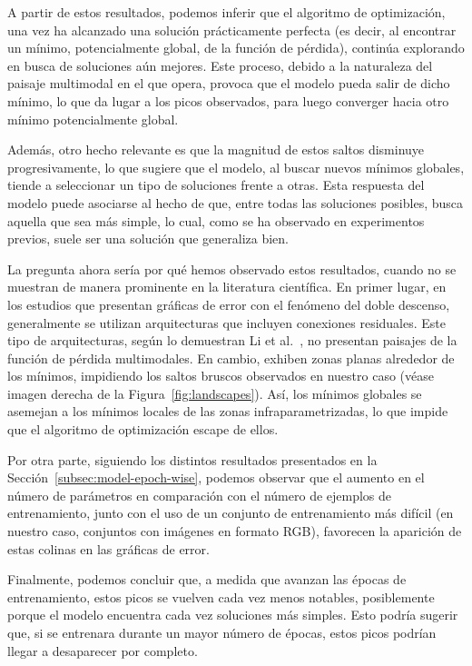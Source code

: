 A partir de estos resultados, podemos inferir que el algoritmo de optimización, una vez ha alcanzado una solución prácticamente perfecta (es decir, al encontrar un mínimo, potencialmente global, de la función de pérdida), continúa explorando en busca de soluciones aún mejores. Este proceso, debido a la naturaleza del paisaje multimodal en el que opera, provoca que el modelo pueda salir de dicho mínimo, lo que da lugar a los picos observados, para luego converger hacia otro mínimo potencialmente global.\newline

Además, otro hecho relevante es que la magnitud de estos saltos disminuye progresivamente, lo que sugiere que el modelo, al buscar nuevos mínimos globales, tiende a seleccionar un tipo de soluciones frente a otras. Esta respuesta del modelo puede asociarse al hecho de que, entre todas las soluciones posibles, busca aquella que sea más simple, lo cual, como se ha observado en experimentos previos, suele ser una solución que generaliza bien.\newline

La pregunta ahora sería por qué hemos observado estos resultados, cuando no se muestran de manera prominente en la literatura científica. En primer lugar, en los estudios que presentan gráficas de error con el fenómeno del doble descenso, generalmente se utilizan arquitecturas que incluyen conexiones residuales. Este tipo de arquitecturas, según lo demuestran Li et al.~\cite{Li2018}, no presentan paisajes de la función de pérdida multimodales. En cambio, exhiben zonas planas alrededor de los mínimos, impidiendo los saltos bruscos observados en nuestro caso (véase imagen derecha de la Figura~\ref{fig:landscapes}). Así, los mínimos globales se asemejan a los mínimos locales de las zonas infraparametrizadas, lo que impide que el algoritmo de optimización escape de ellos.\newline

Por otra parte, siguiendo los distintos resultados presentados en la Sección~\ref{subsec:model-epoch-wise}, podemos observar que el aumento en el número de parámetros en comparación con el número de ejemplos de entrenamiento, junto con el uso de un conjunto de entrenamiento más difícil (en nuestro caso, conjuntos con imágenes en formato RGB), favorecen la aparición de estas colinas en las gráficas de error.\newline

Finalmente, podemos concluir que, a medida que avanzan las épocas de entrenamiento, estos picos se vuelven cada vez menos notables, posiblemente porque el modelo encuentra cada vez soluciones más simples. Esto podría sugerir que, si se entrenara durante un mayor número de épocas, estos picos podrían llegar a desaparecer por completo.\newline

\endinput
